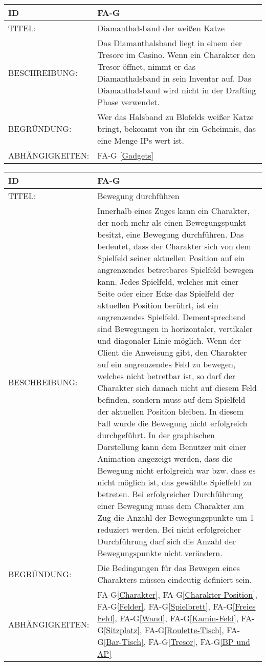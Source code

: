 \begin{tabularx}{16cm}{l|X}
	{table}\label{Diamanthalsband der weissen Katze}
	\textbf{ID} & \textbf{FA-G \arabic{table}} \\
	\hline
	TITEL: & Diamanthalsband der weißen Katze \\
	\hline
	BESCHREIBUNG: & Das Diamanthalsband liegt in einem der Tresore im Casino. Wenn ein Charakter den Tresor öffnet, nimmt er das Diamanthalsband in sein Inventar auf. Das Diamanthalsband wird nicht in der Drafting Phase verwendet. \\
	\hline
	BEGRÜNDUNG: &  Wer das Halsband zu Blofelds weißer Katze bringt, bekommt von ihr ein Geheimnis, das eine Menge IPs wert ist. \\
	\hline
	ABHÄNGIGKEITEN: & FA-G \ref{Gadgets} \\
\end{tabularx}

\begin{tabularx}{16cm}{l|X}
	{table}\label{Bewegung durchfuehren}
	\textbf{ID} & \textbf{FA-G\arabic{table}} \\
	\hline
	TITEL: & Bewegung durchführen \\
	\hline
	BESCHREIBUNG: & Innerhalb eines Zuges kann ein Charakter, der noch mehr als einen Bewegungspunkt besitzt, eine Bewegung durchführen. Das bedeutet, dass der Charakter sich von dem Spielfeld seiner aktuellen Position auf ein angrenzendes betretbares Spielfeld bewegen kann. 
	Jedes Spielfeld, welches mit einer Seite oder einer Ecke das Spielfeld der aktuellen Position berührt, ist ein angrenzendes Spielfeld. Dementsprechend sind Bewegungen in horizontaler, vertikaler und diagonaler Linie möglich. 
	Wenn der Client die Anweisung gibt, den Charakter auf ein angrenzendes Feld zu bewegen, welches nicht betretbar ist, so darf der Charakter sich danach nicht auf diesem Feld befinden, sondern muss auf dem Spielfeld der aktuellen Position bleiben. In diesem Fall wurde die  Bewegung nicht erfolgreich durchgeführt. In der graphischen Darstellung kann dem Benutzer mit einer Animation angezeigt werden, dass die Bewegung nicht erfolgreich war bzw. dass es nicht möglich ist, das gewählte Spielfeld zu betreten. 
 Bei erfolgreicher Durchführung einer Bewegung muss dem Charakter am Zug die Anzahl der Bewegungspunkte um 1 reduziert werden. Bei nicht erfolgreicher Durchführung darf sich die Anzahl der Bewegungspunkte  nicht verändern.\\
	\hline
	BEGRÜNDUNG: & Die Bedingungen für das Bewegen eines Charakters müssen eindeutig definiert sein.\\
	\hline
	ABHÄNGIGKEITEN: & FA-G\ref{Charakter}, FA-G\ref{Charakter-Position}, FA-G\ref{Felder}, FA-G\ref{Spielbrett}, FA-G\ref{Freies Feld}, FA-G\ref{Wand}, FA-G\ref{Kamin-Feld}, FA-G\ref{Sitzplatz}, FA-G\ref{Roulette-Tisch}, FA-G\ref{Bar-Tisch}, FA-G\ref{Tresor}, FA-G\ref{BP und AP} \\
\end{tabularx}

